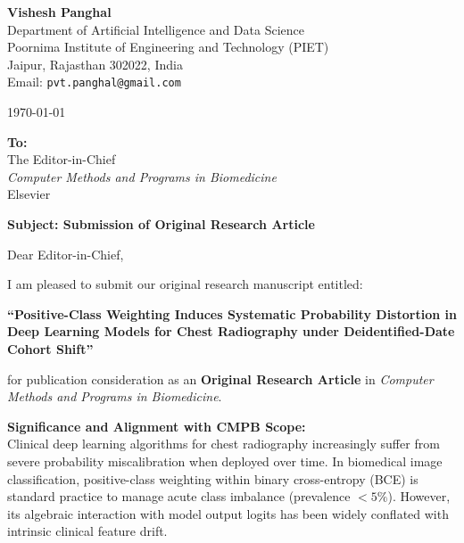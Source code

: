 \documentclass[11pt]{article}
\begin{document}
\textbf{Vishesh Panghal} \\
Department of Artificial Intelligence and Data Science \\
Poornima Institute of Engineering and Technology (PIET) \\
Jaipur, Rajasthan 302022, India \\
Email: \texttt{pvt.panghal@gmail.com}

\vspace{1em}
\today

\textbf{To:} \\
The Editor-in-Chief \\
\textit{Computer Methods and Programs in Biomedicine} \\
Elsevier

\vspace{1em}
\textbf{Subject: Submission of Original Research Article}

Dear Editor-in-Chief,

I am pleased to submit our original research manuscript entitled:

\begin{center}
\textbf{``Positive-Class Weighting Induces Systematic Probability Distortion in Deep Learning Models for Chest Radiography under Deidentified-Date Cohort Shift''}
\end{center}

for publication consideration as an \textbf{Original Research Article} in \textit{Computer Methods and Programs in Biomedicine}.

\textbf{Significance and Alignment with CMPB Scope:} \\
Clinical deep learning algorithms for chest radiography increasingly suffer from severe probability miscalibration when deployed over time. In biomedical image classification, positive-class weighting within binary cross-entropy (BCE) is standard practice to manage acute class imbalance (prevalence $<5\%$). However, its algebraic interaction with model output logits has been widely conflated with intrinsic clinical feature drift.
\end{document}
